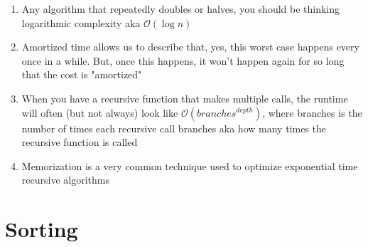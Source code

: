 \documentclass [12pt, executivepaper]{article}
\begin{document}
\begin{enumerate}
\begin{enumerate}
\item Any algorithm that repeatedly doubles or halves, you should be thinking logarithmic complexity aka $\mathcal{O}(\log{} n)$
\item Amortized time allows us to describe that, yes, this worst case happens every once in a while. But, once this happens, it won't happen again for so long that the cost is "amortized"

\item When you have a recursive function that makes multiple calls, the runtime will often (but not always) look like $\mathcal{O}(branches^{depth})$, where branches is the number of times each recursive call branches aka 
how many times the recursive function is called

\item Memorization is a very common technique used to optimize exponential time recursive algorithms

\end{enumerate}

\end{enumerate}

\pagebreak

\vspace*{-40mm}


\section*{Sorting}
\end{document}
